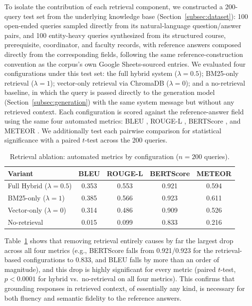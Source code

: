 \documentclass[a4paper,twoside]{article}
\begin{document}
To isolate the contribution of each retrieval component, we constructed a 200-query test set from the underlying knowledge base (Section~\ref{subsec:dataset}): 100 open-ended queries sampled directly from its natural-language question/answer pairs, and 100 entity-heavy queries synthesized from its structured course, prerequisite, coordinator, and faculty records, with reference answers composed directly from the corresponding fields, following the same reference-construction convention as the corpus's own Google Sheets-sourced entries. We evaluated four configurations under this test set: the full hybrid system ($\lambda=0.5$); BM25-only retrieval ($\lambda=1$); vector-only retrieval via ChromaDB ($\lambda=0$); and a no-retrieval baseline, in which the query is passed directly to the generation model (Section~\ref{subsec:generation}) with the same system message but without any retrieved context. Each configuration is scored against the reference-answer field using the same four automated metrics: BLEU \citep{papineni2002}, ROUGE-L \citep{lin2004}, BERTScore \citep{zhang2019}, and METEOR \citep{banerjee2005}. We additionally test each pairwise comparison for statistical significance with a paired $t$-test across the 200 queries.

\begin{table}[t]
\caption{Retrieval ablation: automated metrics by configuration ($n=200$ queries).}\label{tab:ablation} \centering
\begin{tabular}{|l|c|c|c|c|}
\hline
Variant & BLEU & ROUGE-L & BERTScore & METEOR \\
\hline
Full Hybrid ($\lambda=0.5$) & 0.353 & 0.553 & 0.921 & 0.594 \\
BM25-only ($\lambda=1$) & 0.385 & 0.566 & 0.923 & 0.611 \\
Vector-only ($\lambda=0$) & 0.314 & 0.486 & 0.909 & 0.526 \\
No-retrieval & 0.015 & 0.099 & 0.833 & 0.216 \\
\hline
\end{tabular}
\end{table}

Table~\ref{tab:ablation} shows that removing retrieval entirely causes by far the largest drop across all four metrics (e.g., BERTScore falls from 0.921/0.923 for the retrieval-based configurations to 0.833, and BLEU falls by more than an order of magnitude), and this drop is highly significant for every metric (paired $t$-test, $p<0.0001$ for hybrid vs.\ no-retrieval on all four metrics). This confirms that grounding responses in retrieved context, of essentially any kind, is necessary for both fluency and semantic fidelity to the reference answers.
\end{document}
